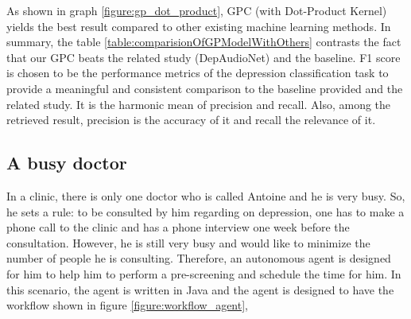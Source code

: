 \documentclass{article}
\begin{document}
        \begin{table}[h!]
        \caption{Our GPC beats the related study (DepAudioNet) and the baseline.}
        \label{table:comparisionOfGPModelWithOthers}
        \end{table}

        As shown in graph \ref{figure:gp_dot_product}, GPC (with Dot-Product Kernel) yields the best result compared to other existing machine learning methods. 
        In summary, the table \ref{table:comparisionOfGPModelWithOthers} contrasts the fact that our GPC beats the related study (DepAudioNet) and the baseline.
        F1 score is chosen to be the performance metrics of the depression classification task to provide a meaningful and consistent comparison to the baseline provided and the related study. It is the harmonic mean of precision and recall. 
        Also, among the retrieved result, precision is the accuracy of it and recall the relevance of it.

    \subsection{A busy doctor}
    In a clinic, there is only one doctor who is called Antoine and he is very busy. 
    So, he sets a rule: to be consulted by him regarding on depression, 
    one has to make a phone call to the clinic and has a phone interview one week before the consultation. 
    However, he is still very busy and would like to minimize the number of people he is consulting. 
    Therefore, an autonomous agent is designed for him to help him to perform a pre-screening and schedule the time for him.
    In this scenario, the agent is written in Java and the agent is designed to have the workflow shown in figure \ref{figure:workflow_agent},
\end{document}
